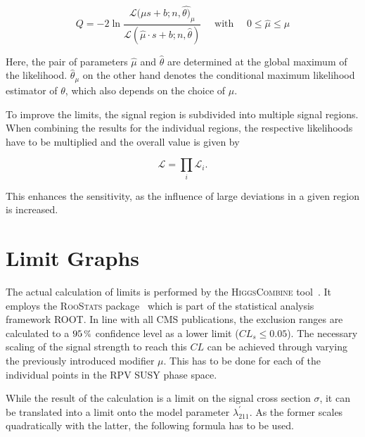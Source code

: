 \begin{equation}
  \label{eq:q-mod}
  Q = - 2 \ln{ \frac{\mathcal{L} (\mu s + b; n, \hat{\theta)}_\mu }{\mathcal{L} (\hat{\mu} \cdot s + b; n, \hat{\theta} )} } \quad \text{ with } \quad 0 \leq \hat{\mu} \leq \mu
\end{equation}

\noindent Here, the pair of parameters $\hat{\mu}$ and $\hat{\theta}$ are determined at the global maximum of the likelihood. $\hat{\theta}_\mu$ on the other hand denotes the conditional maximum likelihood estimator of $\theta$, which also depends on the choice of $\mu$.


To improve the limits, the signal region is subdivided into multiple signal regions. When combining the results for the individual regions, the respective likelihoods have to be multiplied and the overall value is given by

\begin{equation}
  \label{eq:likelihood-product}
  \mathcal{L} = \prod_i \mathcal{L}_i.
\end{equation}

\noindent This enhances the sensitivity, as the influence of large deviations in a given region is increased.

\section{Limit Graphs}
\label{sec:limit-graphs}

The actual calculation of limits is performed by the \textsc{HiggsCombine} tool~\cite{clsmod,higgscombine}. It employs the \textsc{RooStats} package~\cite{roostats} which is part of the statistical analysis framework \textsc{ROOT}. In line with all CMS publications, the exclusion ranges are calculated to a $95\,\pct$ confidence level as a lower limit ($CL_s \leq 0.05$). The necessary scaling of the signal strength to reach this $CL$ can be achieved through varying the previously introduced modifier $\mu$. This has to be done for each of the individual points in the RPV SUSY phase space.

While the result of the calculation is a limit on the signal cross section $\sigma$, it can be translated into a limit onto the model parameter $\lambda^\prime_{211}$. As the former scales quadratically with the latter, the following formula has to be used.

